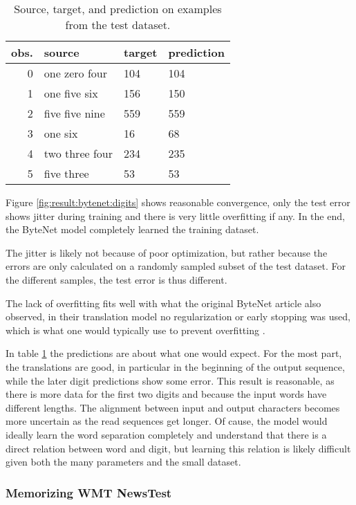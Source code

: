 \begin{table}[h]
\centering
\begin{tabular}{r|p{3.3cm} p{3.3cm} p{3.3cm}}
	obs. & source & target & prediction\\ \hline
  0 & one zero four & 104 & 104 \\
  1 & one five six & 156 & 150 \\
  2 & five five nine & 559 & 559 \\
  3 & one six & 16 & 68 \\
  4 & two three four & 234 & 235 \\
  5 & five three & 53 & 53
\end{tabular}
\caption{Source, target, and prediction on examples from the test dataset.}
\label{table:result:bytenet:digits}
\end{table}

Figure \ref{fig:result:bytenet:digits} shows reasonable convergence, only the test error shows jitter during training and there is very little overfitting if any. In the end, the ByteNet model completely learned the training dataset.

The jitter is likely not because of poor optimization, but rather because the errors are only calculated on a randomly sampled subset of the test dataset. For the different samples, the test error is thus different.

The lack of overfitting fits well with what the original ByteNet article also observed, in their translation model no regularization or early stopping was used, which is what one would typically use to prevent overfitting \cite{bytenet}.

In table \ref{table:result:bytenet:digits} the predictions are about what one would expect. For the most part, the translations are good, in particular in the beginning of the output sequence, while the later digit predictions show some error. This result is reasonable, as there is more data for the first two digits and because the input words have different lengths. The alignment between input and output characters becomes more uncertain as the read sequences get longer. Of cause, the model would ideally learn the word separation completely and understand that there is a direct relation between word and digit, but learning this relation is likely difficult given both the many parameters and the small dataset.

\clearpage
\subsubsection{Memorizing WMT NewsTest}

